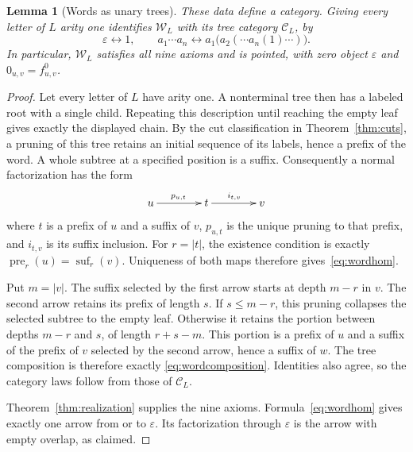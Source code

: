 \documentclass[11pt,a4paper]{article}
\theoremstyle{plain}
\newtheorem{lemma}[theorem]{Lemma}
\theoremstyle{definition}
\theoremstyle{remark}
\newcommand{\C}{\mathcal C}
\newcommand{\one}{1}
\begin{document}
\begin{lemma}[Words as unary trees]\label{prop:wordmodel}
These data define a category. Giving every letter of $L$ arity one
identifies $\mathcal W_L$ with its tree category $\C_L$, by
\[
 \varepsilon\longleftrightarrow\one,
 \qquad
a_1\cdots a_n\longleftrightarrow
a_1\bigl(a_2(\cdots a_n(\one)\cdots)\bigr).
\]
In particular, $\mathcal W_L$ satisfies all nine axioms and is
pointed, with zero object $\varepsilon$ and
$0_{u,v}=f^0_{u,v}$.
\end{lemma}
\begin{proof}
Let every letter of $L$ have arity one. A nonterminal tree then
has a labeled root with a single child. Repeating this description
until reaching the empty leaf gives exactly the displayed chain.
By the cut classification in Theorem~\ref{thm:cuts}, a pruning of
this tree retains an initial sequence of its labels, hence a prefix
of the word. A whole subtree at a specified position is a suffix.
Consequently a normal factorization has the form
\[
 \xymatrix@C=4em{
u\ar[r]^{p_{u,t}}&t\ar[r]^{i_{t,v}}&v
 }
\]
where $t$ is a prefix of $u$ and a suffix of $v$, $p_{u,t}$ is the
unique pruning to that prefix, and $i_{t,v}$ is its suffix inclusion.
For $r=|t|$, the existence condition is exactly
$\operatorname{pre}_r(u)=\operatorname{suf}_r(v)$.
Uniqueness of both maps therefore gives~\eqref{eq:wordhom}.

Put $m=|v|$. The suffix selected by the first arrow starts at depth
$m-r$ in $v$. The second arrow retains its prefix of length $s$.
If $s\le m-r$, this pruning collapses the selected subtree to the
empty leaf. Otherwise it retains the portion between depths
$m-r$ and $s$, of length $r+s-m$. This portion is a prefix of $u$
and a suffix of the prefix of $v$ selected by the second arrow,
hence a suffix of $w$. The tree composition is therefore exactly
\eqref{eq:wordcomposition}. Identities also agree, so the category
laws follow from those of $\C_L$.

Theorem~\ref{thm:realization} supplies the nine axioms.
Formula~\eqref{eq:wordhom} gives exactly one arrow from or to
$\varepsilon$. Its factorization through $\varepsilon$ is the
arrow with empty overlap, as claimed.
\end{proof}
\end{document}
